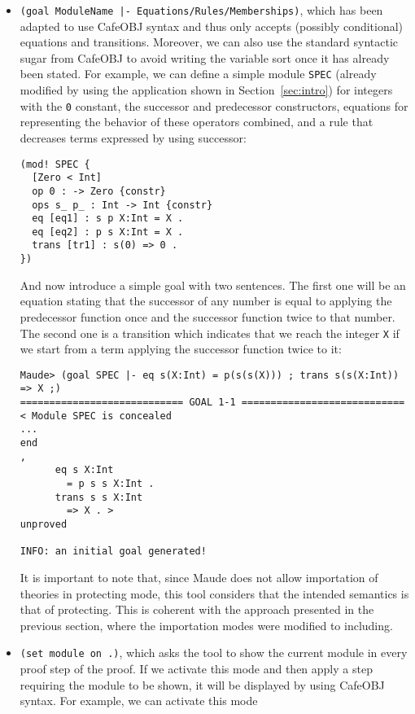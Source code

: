 \begin{itemize}
\item
\verb"(goal ModuleName |- Equations/Rules/Memberships)", which has been adapted to use
CafeOBJ syntax and thus only accepts (possibly conditional) equations and transitions.
Moreover, we can also use the standard syntactic sugar from CafeOBJ to avoid writing
the variable sort once it has already been stated.
For example, we can define a simple module \verb"SPEC" (already modified by using the
application shown in Section~\ref{sec:intro}) for integers with the \verb"0" constant,
the successor and predecessor constructors, equations for representing the behavior of
these operators combined,
and a rule that decreases terms expressed by using successor:

{\codesize
\begin{verbatim}
(mod! SPEC {
  [Zero < Int]
  op 0 : -> Zero {constr}
  ops s_ p_ : Int -> Int {constr}
  eq [eq1] : s p X:Int = X .
  eq [eq2] : p s X:Int = X .
  trans [tr1] : s(0) => 0 .
})
\end{verbatim}
}

And now introduce a simple goal with two sentences. The first one
will be an equation stating that the successor of any number is equal to
applying the predecessor function once and the successor function twice to
that number. The second one is a transition which indicates that we reach
the integer \verb"X" if we start from a term applying the successor function
twice to it:

{\codesize
\begin{verbatim}
Maude> (goal SPEC |- eq s(X:Int) = p(s(s(X))) ; trans s(s(X:Int)) => X ;)
============================ GOAL 1-1 ============================
< Module SPEC is concealed
...
end
,
	  eq s X:Int
	    = p s s X:Int .
	  trans s s X:Int
	    => X . >
unproved

INFO: an initial goal generated!
\end{verbatim}
}

It is important to note that, since Maude does not allow importation of theories
in protecting mode, this tool considers that the intended semantics is that of
protecting. This is coherent with the approach presented in the previous section,
where the importation modes were modified to including.

\item
\verb"(set module on .)", which asks the tool to show the current module in every
proof step of the proof. If we activate this mode and then apply a step requiring
the module to be shown, it will be displayed by using CafeOBJ syntax. For example,
we can activate this mode


\end{itemize}

